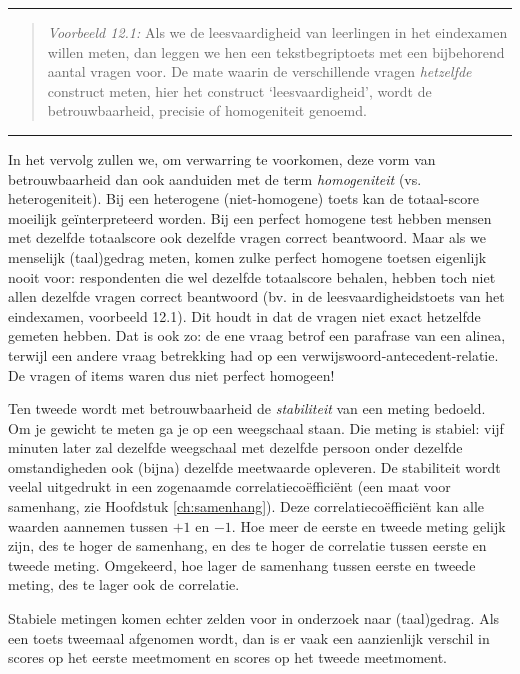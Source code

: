 \documentclass[
]{book}
\begin{document}
\begin{center}\rule{0.5\linewidth}{0.5pt}\end{center}

\begin{quote}
\emph{Voorbeeld 12.1:} Als we de leesvaardigheid van
leerlingen in het eindexamen willen meten, dan leggen we hen een
tekstbegriptoets met een bijbehorend aantal vragen voor. De mate waarin
de verschillende vragen \emph{hetzelfde} construct meten, hier het construct `leesvaardigheid',
wordt de betrouwbaarheid, precisie of homogeniteit genoemd.
\end{quote}

\begin{center}\rule{0.5\linewidth}{0.5pt}\end{center}

In het vervolg zullen we, om verwarring te voorkomen, deze vorm van
betrouwbaarheid dan ook aanduiden met de term \emph{homogeniteit} (vs.
heterogeniteit). Bij een heterogene (niet-homogene) toets kan de
totaal-score moeilijk geïnterpreteerd worden. Bij een perfect homogene
test hebben mensen met dezelfde totaalscore ook dezelfde vragen correct
beantwoord. Maar als we menselijk (taal)gedrag meten, komen zulke
perfect homogene toetsen eigenlijk nooit voor: respondenten die wel
dezelfde totaalscore behalen, hebben toch niet allen dezelfde vragen
correct beantwoord (bv. in de leesvaardigheidstoets van het eindexamen,
voorbeeld 12.1). Dit houdt in dat de
vragen niet exact hetzelfde gemeten hebben. Dat is ook zo: de ene vraag
betrof een parafrase van een alinea, terwijl een andere vraag betrekking
had op een verwijswoord-antecedent-relatie. De vragen of items waren dus
niet perfect homogeen!

Ten tweede wordt met betrouwbaarheid de \emph{stabiliteit} van een meting
bedoeld. Om je gewicht te meten ga je op een weegschaal staan. Die
meting is stabiel: vijf minuten later zal dezelfde weegschaal met
dezelfde persoon onder dezelfde omstandigheden ook (bijna) dezelfde meetwaarde
opleveren. De stabiliteit wordt veelal uitgedrukt in een zogenaamde
correlatiecoëfficiënt (een maat voor samenhang, zie Hoofdstuk
\ref{ch:samenhang}). Deze correlatiecoëfficiënt kan alle waarden
aannemen tussen \(+1\) en \(-1\). Hoe meer de eerste en tweede meting gelijk
zijn, des te hoger de samenhang, en des te hoger de correlatie tussen
eerste en tweede meting. Omgekeerd, hoe lager de samenhang tussen eerste
en tweede meting, des te lager ook de correlatie.

Stabiele metingen komen echter zelden voor in onderzoek naar
(taal)gedrag. Als een toets tweemaal afgenomen wordt, dan is er vaak een
aanzienlijk verschil in scores op het eerste meetmoment en scores op het
tweede meetmoment.
\end{document}
